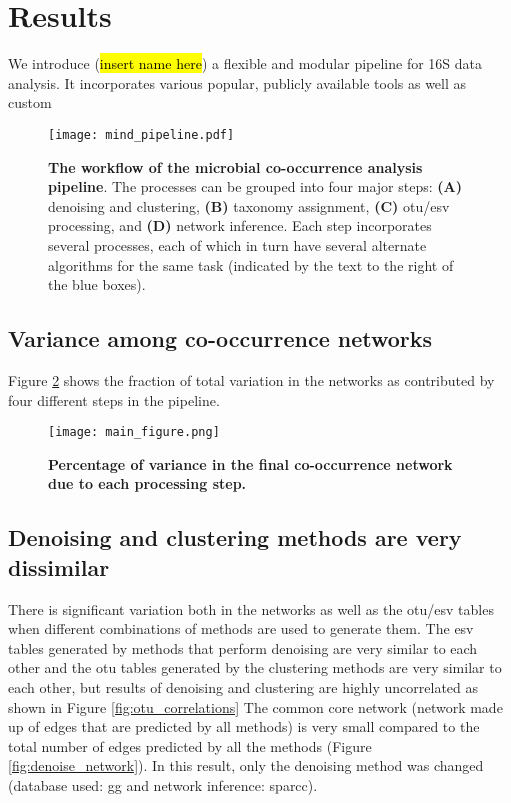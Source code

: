 
\section*{Results}

We introduce (\hl{insert name here}) a flexible and modular pipeline for 16S data analysis. It incorporates various popular, publicly available tools as well as custom

  \begin{figure}[h]
    \centering
    \texttt{[image: mind\_pipeline.pdf]}
    \caption{
      \textbf{The workflow of the microbial co-occurrence analysis pipeline}.
      The processes can be grouped into four major steps: \textbf{(A)} denoising and clustering, \textbf{(B)} taxonomy assignment, \textbf{(C)} \ac{otu}/\ac{esv} processing, and \textbf{(D)} network inference.
      Each step incorporates several processes, each of which in turn have several alternate algorithms for the same task (indicated by the text to the right of the blue boxes).
    }
    \label{fig:mind_pipeline}
  \end{figure}

  \FloatBarrier

  \subsection*{Variance among co-occurrence networks}

  Figure \ref{fig:variance} shows the fraction of total variation in the networks as contributed by four different steps in the pipeline.

  \begin{figure}[h]
    \centering
    \texttt{[image: main\_figure.png]}
    \caption{\textbf{Percentage of variance in the final co-occurrence network due to each processing step.}}
    \label{fig:variance}
  \end{figure}


  \FloatBarrier

  \subsection*{Denoising and clustering methods are very dissimilar}

  There is significant variation both in the networks as well as the \ac{otu}/\ac{esv} tables when different combinations of methods are used to generate them.
  The \ac{esv} tables generated by methods that perform denoising are very similar to each other and the \ac{otu} tables generated by the clustering methods are very similar to each other, but results of denoising and clustering are highly uncorrelated as shown in Figure \ref{fig:otu_correlations}
  The common core network (network made up of edges that are predicted by all methods) is very small compared to the total number of edges predicted by all the methods (Figure \ref{fig:denoise_network}).
  In this result, only the denoising method was changed (database used: \ac{gg} and network inference: \ac{sparcc}).


